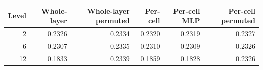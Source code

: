 \begin{tabular}{rrrrrr}
\toprule
Level & Whole-layer & Whole-layer permuted & Per-cell & Per-cell MLP & Per-cell permuted \\
\midrule
2 & 0.2326 & 0.2334 & 0.2320 & 0.2319 & 0.2327 \\
6 & 0.2307 & 0.2335 & 0.2310 & 0.2309 & 0.2326 \\
12 & 0.1833 & 0.2339 & 0.1859 & 0.1828 & 0.2326 \\
\bottomrule
\end{tabular}
